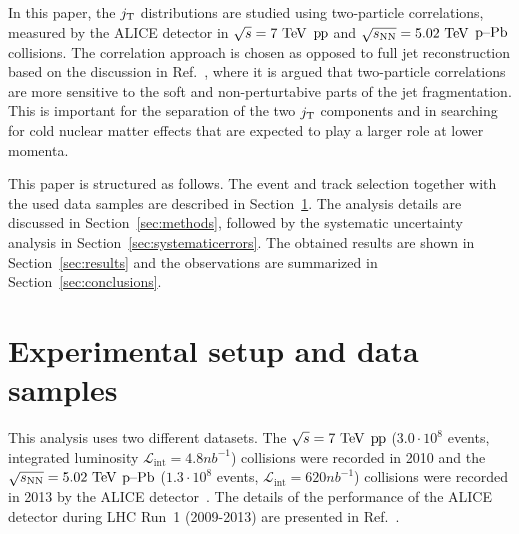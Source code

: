 In this paper, the $j_{\rm T}$ distributions are studied using two-particle correlations, measured by the ALICE detector in $\sqrt{s} = 7~\mathrm{TeV}$ $\mbox{p\kern-0.05em p}$ and $\sqrt{s_{\mathrm{NN}}} = 5.02~\mathrm{TeV}$ $\mbox{p--Pb}$ collisions. The correlation approach is chosen as opposed to full jet reconstruction based on the discussion in Ref.~\cite{thorstenBiasProceedings,Renk:2011wp}, where it is argued that two-particle correlations are more sensitive to the soft and non-perturtabive parts of the jet fragmentation. This is important for the separation of the two $j_{\rm T}$ components and in searching for cold nuclear matter effects that are expected to play a larger role at lower momenta.

This paper is structured as follows. The event and track selection together with the used data samples are described in Section~\ref{sec:experimentaldetails}. The analysis details are discussed in Section~\ref{sec:methods}, followed by the systematic uncertainty analysis in Section~\ref{sec:systematicerrors}. The obtained results are shown in Section~\ref{sec:results} and the observations are summarized in Section~\ref{sec:conclusions}.

\section{Experimental setup and data samples}
\label{sec:experimentaldetails}

This analysis uses two different datasets. The $\sqrt{s} = 7~\mathrm{TeV}$ $\mbox{p\kern-0.05em p}$ ($3.0 \cdot 10^{8}$ events, integrated luminosity $\mathcal{L}_{\mathrm{int}} = \unit{4.8}{nb^{-1}}$) collisions were recorded in 2010 and the $\sqrt{s_{\mathrm{NN}}} = 5.02~\mathrm{TeV}$ $\mbox{p--Pb}$ ($1.3 \cdot 10^{8}$ events, $\mathcal{L}_{\mathrm{int}} = \unit{620}{nb^{-1}}$) collisions were recorded in 2013 by the ALICE detector~\cite{aliceDetector}. The details of the performance of the ALICE detector during LHC Run~1 (2009-2013) are presented in Ref.~\cite{alicePerformance}.

